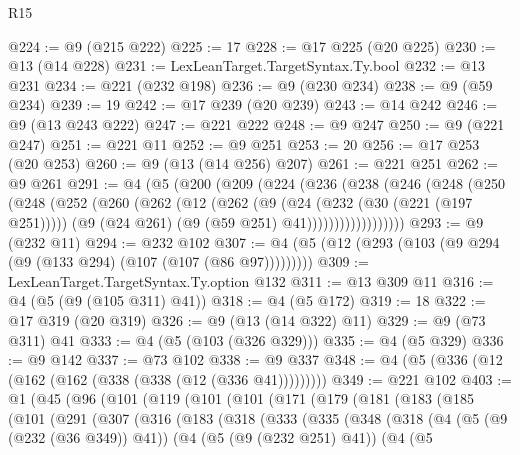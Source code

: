 \begin{lexlean}{R15}
\begin{coremodule}
@224 := @9 (@215 @222)
@225 := 17
@228 := @17 @225 (@20 @225)
@230 := @13 (@14 @228)
@231 := LexLeanTarget.TargetSyntax.Ty.bool
@232 := @13 @231
@234 := @221 (@232 @198)
@236 := @9 (@230 @234)
@238 := @9 (@59 @234)
@239 := 19
@242 := @17 @239 (@20 @239)
@243 := @14 @242
@246 := @9 (@13 @243 @222)
@247 := @221 @222
@248 := @9 @247
@250 := @9 (@221 @247)
@251 := @221 @11
@252 := @9 @251
@253 := 20
@256 := @17 @253 (@20 @253)
@260 := @9 (@13 (@14 @256) @207)
@261 := @221 @251
@262 := @9 @261
@291 := @4
    (@5
      (@200
        (@209
          (@224
            (@236
              (@238
                (@246
                  (@248
                    (@250
                      (@248
                        (@252
                          (@260
                            (@262
                              (@12
                                (@262
                                  (@9
                                    (@24 (@232 (@30 (@221 (@197 @251)))))
                                    (@9 (@24 @261) (@9 (@59 @251) @41))))))))))))))))))
@293 := @9 (@232 @11)
@294 := @232 @102
@307 := @4 (@5 (@12 (@293 (@103 (@9 @294 (@9 (@133 @294) (@107 (@107 (@86 @97)))))))))
@309 := LexLeanTarget.TargetSyntax.Ty.option @132
@311 := @13 @309 @11
@316 := @4 (@5 (@9 (@105 @311) @41))
@318 := @4 (@5 @172)
@319 := 18
@322 := @17 @319 (@20 @319)
@326 := @9 (@13 (@14 @322) @11)
@329 := @9 (@73 @311) @41
@333 := @4 (@5 (@103 (@326 @329)))
@335 := @4 (@5 @329)
@336 := @9 @142
@337 := @73 @102
@338 := @9 @337
@348 := @4 (@5 (@336 (@12 (@162 (@162 (@338 (@338 (@12 (@336 @41)))))))))
@349 := @221 @102
@403 := @1
    (@45
      (@96
        (@101
          (@119
            (@101
              (@101
                (@171
                  (@179
                    (@181
                      (@183
                        (@185
                          (@101
                            (@291
                              (@307
                                (@316
                                  (@183
                                    (@318
                                      (@333
                                        (@335
                                          (@348
                                            (@318
                                              (@4
                                                (@5 (@9 (@232 (@36 @349)) @41))
                                                (@4
                                                  (@5 (@9 (@232 @251) @41))
                                                  (@4
                                                    (@5

\end{coremodule}
\end{lexlean}
